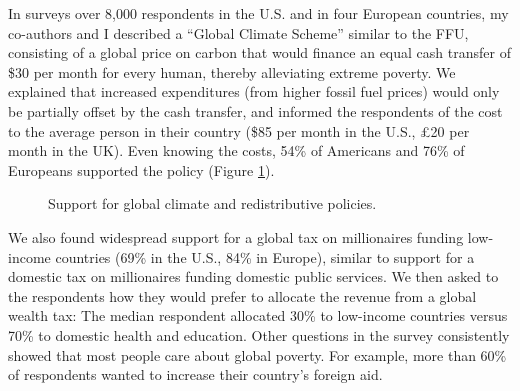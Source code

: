 \documentclass[12pt,english]{article}
\begin{document}

In surveys over 8,000 respondents in the U.S. and in four European countries,\citep{fabre_majority_2025} my co-authors and I described a ``Global Climate Scheme'' similar to the FFU, consisting of a global price on carbon that would finance an equal cash transfer of \$30 per month for every human, thereby alleviating extreme poverty. We explained that increased expenditures (from higher fossil fuel prices) would only be partially offset by the cash transfer, and informed the respondents of the cost to the average person in their country (\$85 per month in the U.S., £20 per month in the UK). Even knowing the costs, 54\% of Americans and 76\% of Europeans supported the policy (Figure \ref{fig:support}). 

\begin{figure}[h] %
  \caption[Support for global policies]{Support for global climate and redistributive policies.} 
  \label{fig:support} 
\end{figure}

We also found widespread support for a global tax on millionaires funding low-income countries (69\% in the U.S., 84\% in Europe), similar to support for a domestic tax on millionaires funding domestic public services. We then asked to the respondents how they would prefer to allocate the revenue from a global wealth tax: The median respondent allocated 30\% to low-income countries versus 70\% to domestic health and education. Other questions in the survey consistently showed that most people care about global poverty. For example, more than 60\% of respondents wanted to increase their country's foreign aid.
\end{document}
